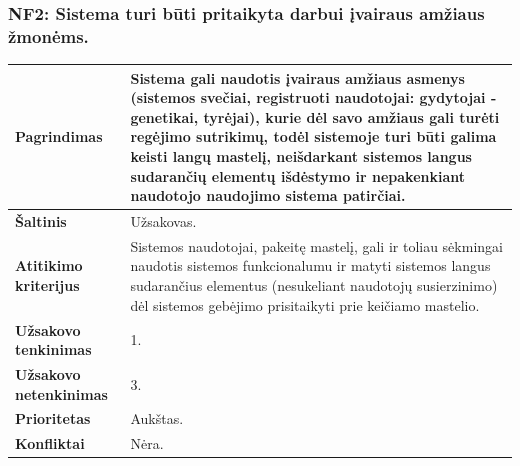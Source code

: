 \documentclass[12pt]{article}
\begin{document}
\subsubsection*{NF2: Sistema turi būti pritaikyta darbui įvairaus amžiaus
žmonėms.}
\label{sec:NF2}
\begin{table}[htb!]
    \captionsetup{justification=centering}
    \begin{tabular}{|m{4.9cm}|m{11cm}|}
        \hline
        \raggedleft \textbf{\cellcolor{deepchampagne}Pagrindimas} &
        Sistema gali naudotis įvairaus amžiaus asmenys (sistemos svečiai,
        registruoti naudotojai: gydytojai - genetikai, tyrėjai), kurie dėl savo
        amžiaus gali turėti regėjimo sutrikimų, todėl sistemoje turi būti galima
        keisti langų mastelį, neišdarkant sistemos langus sudarančių elementų
        išdėstymo ir nepakenkiant naudotojo naudojimo sistema patirčiai. \\
        \hline
        \raggedleft \textbf{\cellcolor{deepchampagne}Šaltinis} & Užsakovas. \\
        \hline
        \raggedleft \textbf{\cellcolor{deepchampagne}Atitikimo kriterijus} & 
        Sistemos naudotojai, pakeitę mastelį, gali ir toliau sėkmingai naudotis
        sistemos funkcionalumu ir matyti sistemos langus sudarančius elementus
        (nesukeliant naudotojų susierzinimo) dėl sistemos gebėjimo prisitaikyti
        prie keičiamo mastelio. \\
        \hline
        \raggedleft \textbf{\cellcolor{deepchampagne}Užsakovo tenkinimas} & 1. \\
        \hline
        \raggedleft \textbf{\cellcolor{deepchampagne}Užsakovo netenkinimas} & 3. \\
        \hline
        \raggedleft \textbf{\cellcolor{deepchampagne}Prioritetas} & Aukštas. \\
        \hline
        \raggedleft \textbf{\cellcolor{deepchampagne}Konfliktai} & Nėra. \\
        \hline
    \end{tabular}
\end{table}

\newpage
\end{document}
